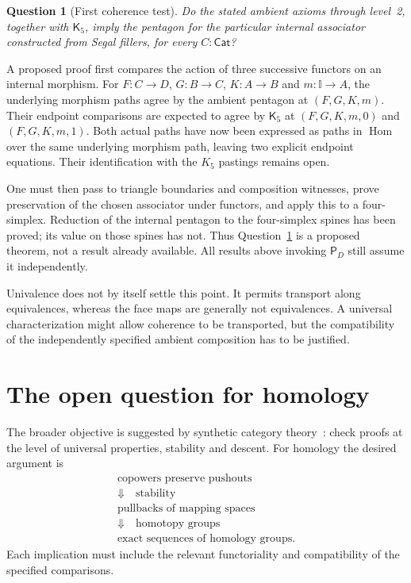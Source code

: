\documentclass[11pt,a4paper]{amsart}
\newtheorem{question}[proposition]{Question}
\theoremstyle{definition}
\newcommand{\Cat}{\mathsf{Cat}}
\newcommand{\Hom}{\operatorname{Hom}}
\newcommand{\I}{\mathbb I}
\newcommand{\PD}{\mathsf P_D}
\newcommand{\Kfive}{\mathsf K_5}
\begin{document}
\begin{question}[First coherence test]\label{q:pent}
Do the stated ambient axioms through level~2, together with $\Kfive$,
imply the pentagon for the particular internal associator constructed
from Segal fillers, for every $C:\Cat$?
\end{question}

A proposed proof first compares the action of three successive functors
on an internal morphism. For $F:C\to D$, $G:B\to C$, $K:A\to B$ and
$m:\I\to A$, the underlying morphism paths agree by the ambient
pentagon at $(F,G,K,m)$. Their endpoint comparisons are expected to agree
by $\Kfive$ at $(F,G,K,m,0)$ and $(F,G,K,m,1)$.
Both actual paths have now been expressed as paths in $\Hom$ over the
same underlying morphism path, leaving two explicit endpoint equations.
Their identification with the $K_5$ pastings remains open.

One must then pass to triangle boundaries and composition witnesses,
prove preservation of the chosen associator under functors, and apply
this to a four-simplex. Reduction of the internal pentagon to the
four-simplex spines has been proved; its value on those spines has not.
Thus Question~\ref{q:pent} is a proposed theorem, not a result already
available. All results above invoking $\PD$ still assume it independently.

Univalence does not by itself settle this point. It permits transport
along equivalences, whereas the face maps are generally not
equivalences. A universal characterization might allow coherence to be
transported, but the compatibility of the independently specified
ambient composition has to be justified.

\clearpage
\section{The open question for homology}

The broader objective is suggested by synthetic category
theory~\cite{CCNW}: check proofs at the level of universal properties,
stability and descent. For homology the desired argument is
\[
 \begin{gathered}
 \text{copowers preserve pushouts}\\
 \Downarrow\quad\text{stability}\\
 \text{pullbacks of mapping spaces}\\
 \Downarrow\quad\text{homotopy groups}\\
 \text{exact sequences of homology groups}.
 \end{gathered}
\]
Each implication must include the relevant functoriality and
compatibility of the specified comparisons.
\end{document}
